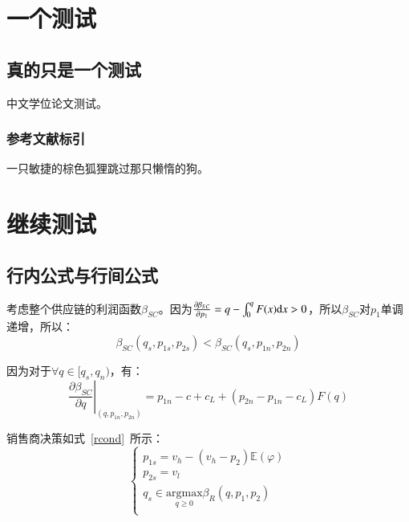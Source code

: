 \chapter{一个测试}

\section{真的只是一个测试}

中文学位论文测试\cite{chandrasekhar2003newton,arnold1990huygens}。

\subsection{参考文献标引}

一只敏捷的棕色狐狸跳过那只懒惰的狗\cite{chandrasekhar2003newton,arnold1990huygens}。

\chapter{继续测试}

\section{行内公式与行间公式}

考虑整个供应链的利润函数$\beta_{SC}$。因为$\frac{\partial\beta_{SC}}{\partial p_1}=q-\int_0^q F(x)\mathrm{d} x>0$，所以$\beta_{SC}$对$p_1$单调递增，所以：
\begin{equation}
\label{dscNoStgProof0}
\beta_{SC}(q_s,p_{1s},p_{2s})<\beta_{SC}(q_s,p_{1n},p_{2n})
\end{equation}

因为对于$\forall q\in[q_s, q_n)$，有：
\[ \left.\frac{\partial \beta_{SC}}{\partial q}\right|_{(q,p_{1n},p_{2n})}=p_{1n}-c+c_L+(p_{2n}-p_{1n}-c_L)F(q) \]

销售商决策如式~\eqref{rcond}~所示：
\begin{equation}
\label{rcond}
\left\{\begin{array}{l}
p_{1s}=v_h-(v_h-p_2)\mathbb{E}(\varphi) \\
p_{2s}=v_l \\
q_s \in \underset{q \geq 0}{\mathrm{argmax}} \beta_R (q, p_1, p_2) \\
\end{array}\right.
\end{equation}

